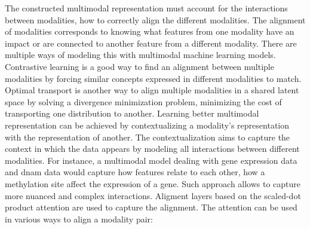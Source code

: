 \documentclass[../main.tex]{subfiles}
\begin{document}
		The constructed multimodal representation must account for the interactions between modalities, \ie{}how to correctly align the different modalities.
		The alignment of modalities corresponds to knowing what features from one modality have an impact or are connected to another feature from a different modality.
		There are multiple ways of modeling this with multimodal machine learning models.
		Contrastive learning is a good way to find an alignment between multiple modalities by forcing similar concepts expressed in different modalities to match.
		Optimal transport is another way to align multiple modalities in a shared latent space by solving a divergence minimization problem, \ie{}minimizing the cost of transporting one distribution to another.
		Learning better multimodal representation can be achieved by contextualizing a modality's representation with the representation of another.
		The contextualization aims to capture the context in which the data appears by modeling all interactions between different modalities.
		For instance, a multimodal model dealing with gene expression data and \gls{dnam} data would capture how features relate to each other, \ie{}how a methylation site affect the expression of a gene.
		Such approach allows to capture more nuanced and complex interactions.
		Aligment layers based on the scaled-dot product attention are used to capture the alignment.
		The attention can be used in various ways to align a modality pair:
\end{document}

